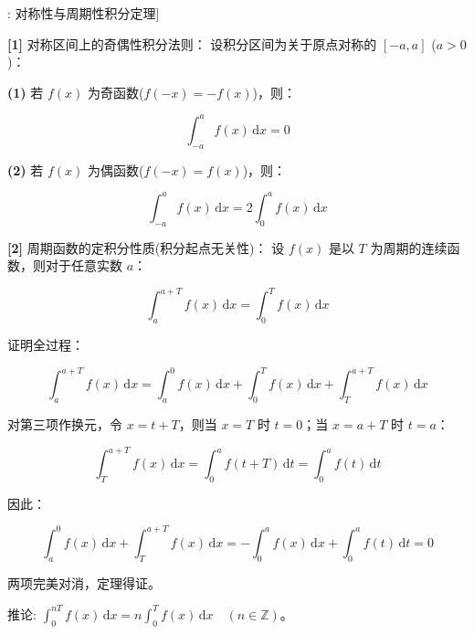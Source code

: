 \documentclass[11pt,a4paper,UTF8]{ctexart}
\begin{document}
\begin{thmbox}[定理[2]: 对称性与周期性积分定理]

\textbf{[1]} 对称区间上的奇偶性积分法则：
设积分区间为关于原点对称的 $[-a, a]$ ($a > 0$)：

\textbf{(1)}  若 $f(x)$ 为奇函数($f(-x) = -f(x)$)，则：


\begin{equation*}
\int_{-a}^a f(x)\,\mathrm{d}x = 0
\end{equation*}


\textbf{(2)}  若 $f(x)$ 为偶函数($f(-x) = f(x)$)，则：


\begin{equation*}
\int_{-a}^a f(x)\,\mathrm{d}x = 2\int_0^a f(x)\,\mathrm{d}x
\end{equation*}


\textbf{[2]} 周期函数的定积分性质(积分起点无关性)：
设 $f(x)$ 是以 $T$ 为周期的连续函数，则对于任意实数 $a$：


\begin{equation*}
\int_a^{a+T} f(x)\,\mathrm{d}x = \int_0^T f(x)\,\mathrm{d}x
\end{equation*}


证明全过程：


\begin{equation*}
\int_a^{a+T} f(x)\,\mathrm{d}x = \int_a^0 f(x)\,\mathrm{d}x + \int_0^T f(x)\,\mathrm{d}x + \int_T^{a+T} f(x)\,\mathrm{d}x
\end{equation*}


对第三项作换元，令 $x = t + T$，则当 $x=T$ 时 $t=0$；当 $x=a+T$ 时 $t=a$：


\begin{equation*}
\int_T^{a+T} f(x)\,\mathrm{d}x = \int_0^a f(t+T)\,\mathrm{d}t = \int_0^a f(t)\,\mathrm{d}t
\end{equation*}


因此：


\begin{equation*}
\int_a^0 f(x)\,\mathrm{d}x + \int_T^{a+T} f(x)\,\mathrm{d}x = -\int_0^a f(x)\,\mathrm{d}x + \int_0^a f(t)\,\mathrm{d}t = 0
\end{equation*}


两项完美对消，定理得证。

推论: $\int_0^{nT} f(x)\,\mathrm{d}x = n\int_0^T f(x)\,\mathrm{d}x \quad (n \in \mathbb{Z})$。

\end{thmbox}
\end{document}
